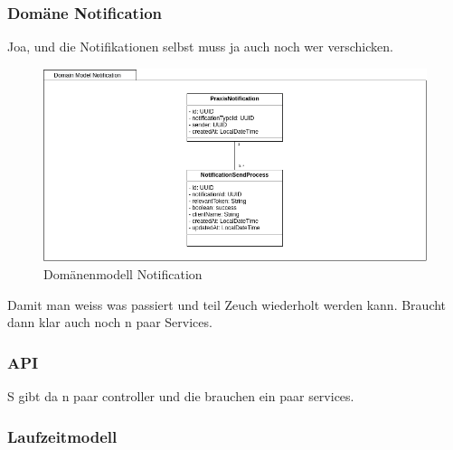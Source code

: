 \clearpage
\subsubsection*{Domäne Notification}

Joa, und die Notifikationen selbst muss ja auch noch wer verschicken.

\begin{figure}[h]
    \centering
    \begin{minipage}[b]{1.0\textwidth}
        \includegraphics[width=\textwidth]{graphics/Class_Notification_Domain}
        \caption{Domänenmodell Notification}
    \end{minipage}
\end{figure}

Damit man weiss was passiert und teil Zeuch wiederholt werden kann.
Braucht dann klar auch noch n paar Services.




\clearpage
\subsubsection{API}

S gibt da n paar controller und die brauchen ein paar services.

\clearpage
\subsubsection{Laufzeitmodell}

\clearpage
